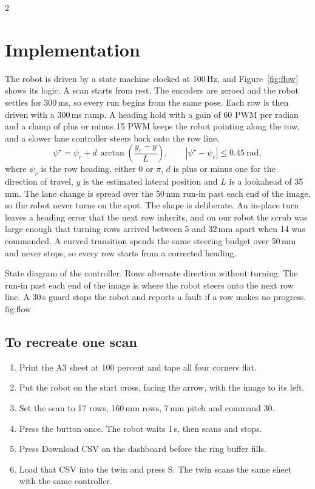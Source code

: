 \documentclass[a4paper,10pt]{article}
\begin{document}
\begin{multicols*}{2}
\section{Implementation}
The robot is driven by a state machine clocked at 100\,Hz, and
Figure~\ref{fig:flow} shows its logic. A scan starts from rest. The encoders are
zeroed and the robot settles for 300\,ms, so every run begins from the same
pose. Each row is then driven with a 300\,ms ramp. A heading hold with a gain of
60 PWM per radian and a clamp of plus or minus 15 PWM keeps the robot pointing
along the row, and a slower lane controller steers back onto the row line,
\begin{equation}
  \psi^\star = \psi_r + d\,\arctan\!\left(\frac{y_r-y}{L}\right),
  \qquad |\psi^\star-\psi_r|\le 0.45\ \text{rad},
  \label{eq:steer}
\end{equation}
where $\psi_r$ is the row heading, either 0 or $\pi$, $d$ is plus or minus one
for the direction of travel, $y$ is the estimated lateral position and $L$ is a
lookahead of 35\,mm. The lane change is spread over the 50\,mm run-in past each
end of the image, so the robot never turns on the spot. The shape is deliberate.
An in-place turn leaves a heading error that the next row inherits, and on our
robot the scrub was large enough that turning rows arrived between 5 and 32\,mm
apart when 14 was commanded. A curved transition spends the same steering budget
over 50\,mm and never stops, so every row starts from a corrected heading.

%
{State diagram of the controller. Rows alternate direction without turning. The
run-in past each end of the image is where the robot steers onto the next row
line. A 30\,s guard stops the robot and reports a fault if a row makes no
progress.}
{fig:flow}

\subsection*{To recreate one scan}
\begin{enumerate}
\setlength{\itemsep}{0pt}
\item Print the A3 sheet at 100 percent and tape all four corners flat.
\item Put the robot on the start cross, facing the arrow, with the image to its
left.
\item Set the scan to 17 rows, 160\,mm rows, 7\,mm pitch and command 30.
\item Press the button once. The robot waits 1\,s, then scans and stops.
\item Press Download CSV on the dashboard before the ring buffer fills.
\item Load that CSV into the twin and press S. The twin scans the same sheet
with the same controller.
\end{enumerate}


\end{multicols*}
\end{document}
